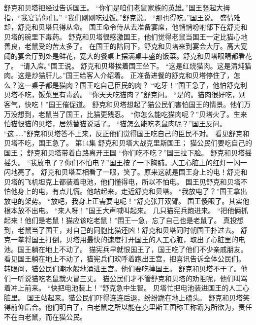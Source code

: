 \documentclass[a4paper,12pt,UTF8,twoside]{ctexbook}
\begin{document}
        舒克和贝塔把经过告诉国王。 
        “你们是咱们老鼠家族的英雄。”国王竖起大拇指，“我宴请你们。” 
        “我们刚刚吃过饭。”舒克说。 
        “那也得吃。”国王说。 
        盛情难却，舒克和贝塔只得从命。 
        国王命令侍从去准备宴席，他悄悄吩咐部下在舒克和贝塔的碗里下毒药。 
        舒克和贝塔很感激国王，他们觉得老鼠当国王一定比猫心地善良，老鼠受的苦太多了。 
        在国王的陪同下，舒克和贝塔来到宴会大厅。高大宽阔的宴会厅到处是鲜花，宽大的餐桌上摆满桌丰盛的饭菜。舒克和贝塔眼睛都看花了。 
        “请入席。”国王说。 
        舒克和贝塔挨着国王坐下。 
        “这是红烧猫肉。这是清炖猫肉。这是炒猫肝儿。”国王给客人介绍着。 
        正准备进餐的舒克和贝塔停住了，怎么？这一桌子都是猫肉？国王吃自己臣民的肉？ 
        “吃牙！”国王急了，他怕舒克利贝塔不吃，饭菜里有毒药。 
        “你天天吃猫肉？”舒克问。 
        “是的。猫肉很好吃，别客气，快吃！”国王催促道。 
        舒克和贝塔想起了猫公民们害怕国王的情景。他们万万没想到，老鼠当了国王，比猫更残忍。 
        “你怎么能吃猫肉呢？”贝塔火了。生来怕猫恨猫的贝塔，居然替猫说话了。 
        “猫怎么能吃老鼠肉呢？”国王反问。 
        “这……”舒克和贝塔答不上来，反正他们觉得国王吃自己的臣民不对。 
        看见舒克和贝塔不吃，国王急了。   第14集 
        舒克和贝塔大战克里斯国王； 
        猫公民们要吃自己的国王； 
        舒克和贝塔带着白路离开王国   
        “你们吃不吃？”国王拉下脸。 
        舒克和贝塔摇摇头。 
        “我放电了？你们不怕电？”国王按了一下胸脯。人工心脏上的红灯一闪一闪地亮了。 
        舒克和贝塔互相看了一眼，笑了。原来这就是国王身上的电！舒克和贝塔的飞机坦克上都装着电池，他们懂得电，所以不怕电。 
        国王见舒克和贝塔不怕他身上的电，有点儿慌。他站起来，走近舒克和贝塔。 
        “我放电了？”国王拿出放电的架势。 
        “放吧，我身上正需要电呢！”舒克张开双臂。 
        国王傻眼了。其实他根本放不出电。 
        “来人呀！”国王大声喊叫起来。 
        几只猫宪兵跑进来。 
        “把他俩抓起来！他们是老鼠！猫应该吃老鼠！”围王一急，忘了自己也是老鼠了。 
        真投想到，老鼠当了国王，对自己的同胞比猫还凶！舒克和贝塔同时朝国王扑过去。 
        舒克一拳将国王打倒，贝塔用最快的速度打开国王的人工心脏，取出了心脏里的电池。国王躺在地上不动了。 
        猫宪兵早就恨国王了，国王吃了他们不少亲戚朋友。看见国王躺在地上不动了，猫宪兵们欢呼着跑出王宫，把喜讯告诉全体公民们。 
        转眼间，猫公民们潮水般地涌进王宫。他们要吃掉国王。 
        舒克和贝塔不干了。他们一听说猫吃老鼠就火冒三丈。 
        猫公民们才不管舒克和贝塔的劝阻呢，他们叫骂着冲上前来。 
        “快把电池装上！”舒克急中生智。 
        贝塔忙把电池装进国王的人工心脏里。 
        国王站起来。猫公民们吓得连连后退，纷纷跪在地上磕头。 
        舒克和贝塔笑得前仰后合。他们明白了，白老鼠之所以能在克里斯王国称王称霸为所欲为，责任不在白老鼠，而在猫公民。 
\end{document}
